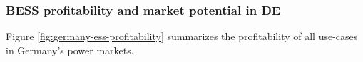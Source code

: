 




\subsubsection{BESS profitability and market potential in DE}

Figure \ref{fig:germany-ess-profitability} summarizes the profitability of all use-cases in Germany's power markets. 

